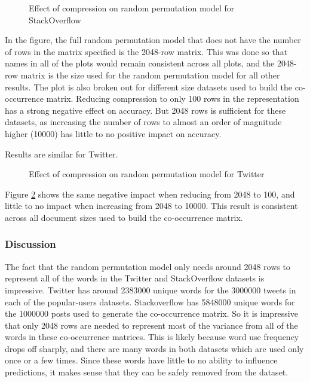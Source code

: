 \documentclass[man,floatsintext,donotrepeattitle]{apa6}
\begin{document}
\begin{figure}[!htbp]
  \caption{Effect of compression on random permutation model for StackOverflow}
  \label{figContextDimSO}
\end{figure}

In the figure, the full random permutation model that does not have the number of rows in the matrix specified is the \num{2048}-row matrix.
This was done so that names in all of the plots would remain consistent across all plots, and the \num{2048}-row matrix is the size used for the random permutation model for all other results.
The plot is also broken out for different size datasets used to build the co-occurrence matrix.
Reducing compression to only 100 rows in the representation has a strong negative effect on accuracy.
But \num{2048} rows is sufficient for these datasets, as increasing the number of rows to almost an order of magnitude higher (\num{10000}) has little to no positive impact on accuracy.

Results are similar for Twitter.

\begin{figure}[!htbp]
  \caption{Effect of compression on random permutation model for Twitter}
  \label{figContextDimT}
\end{figure}

Figure \ref{figContextDimT} shows the same negative impact when reducing from \num{2048} to \num{100}, and little to no impact when increasing from \num{2048} to \num{10000}.
This result is consistent across all document sizes used to build the co-occurrence matrix.

\subsubsection{Discussion}

The fact that the random permutation model only needs around \num{2048} rows to represent all of the words in the Twitter and StackOverflow datasets is impressive.
Twitter has around \num{2383000} unique words for the \num{3000000} tweets in each of the popular-users datasets.
Stackoverflow has \num{5848000} unique words for the \num{1000000} posts used to generate the co-occurrence matrix.
So it is impressive that only \num{2048} rows are needed to represent most of the variance from all of the words in these co-occurrence matrices.
This is likely because word use frequency drops off sharply, and there are many words in both datasets which are used only once or a few times.
Since these words have little to no ability to influence predictions, it makes sense that they can be safely removed from the dataset.
\end{document}
